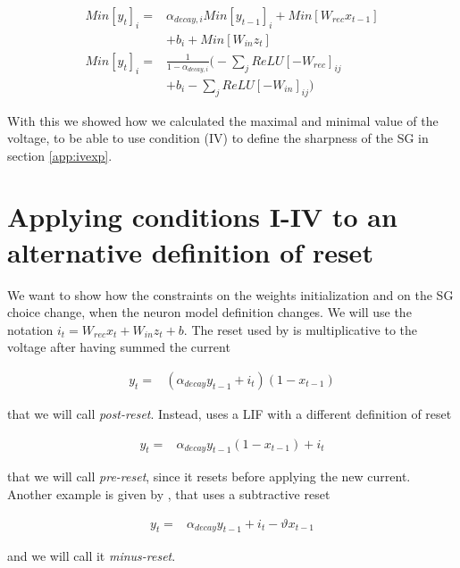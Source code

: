 \begin{align}
    Min[y_t]_i =& \alpha_{decay,i} Min[y_{t-1}]_i + Min[W_{rec}x_{t-1}] \nonumber \\&+ b_i + Min[W_{in}z_t] \\
    Min[y_t]_i =& \frac{1}{1-\alpha_{decay,i}}\Big( -\sum_{j} ReLU[-W_{rec}]_{ij} \nonumber \\&+ b_i -\sum_{j} ReLU[-W_{in}]_{ij} \Big) 
\end{align}

With this we showed how we calculated the maximal and minimal value of the voltage, to be able to use condition (IV) to define the sharpness of the SG in section \ref{app:ivexp}.



\section{Applying conditions I-IV to an alternative definition of reset}
\label{app:mulreset}

We want to show how the constraints on the weights initialization and on the SG choice change, when the neuron model definition changes. We will use the notation $i_t  = W_{rec}x_t + W_{in}z_t + b$. The reset used by \cite{zenke2021remarkable} is multiplicative to the voltage after having summed the current

\begin{align}
    y_t =&  (\alpha_{decay}y_{t-1} +i_t)(1 - x_{t-1})
\end{align}

\noindent that we will call \textit{post-reset}. Instead,  \cite{wozniak2020deep} uses a LIF with a different definition of reset

\begin{align}
    y_t =&  \alpha_{decay}y_{t-1}(1 - x_{t-1}) +i_t
\end{align}

\noindent that we will call \textit{pre-reset}, since it resets before applying the new current. Another example is given by \cite{lsnn}, that uses a subtractive reset


\begin{align}
    y_t =&  \alpha_{decay}y_{t-1} +i_t -\vartheta x_{t-1} 
\end{align}

\noindent and we will call it \textit{minus-reset}.


